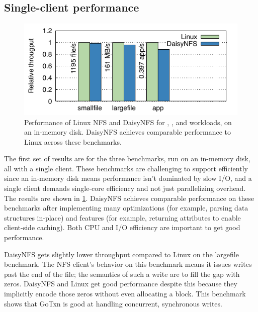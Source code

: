\subsection{Single-client performance}



\begin{figure}[ht]
  \centering
  \includegraphics{daisy-nfs/fig/bench.pdf}
  \caption[Performance for smallfile, largefile, and app benchmarks]%
  {Performance of Linux NFS and DaisyNFS for ,
    , and  workloads, on an in-memory disk.
    DaisyNFS achieves comparable performance to Linux across these benchmarks.}
  \label{fig:eval:bench}
\end{figure}

The first set of results are for the three benchmarks, run on an in-memory disk, all
with a single client. These benchmarks are challenging to support efficiently
since an in-memory disk means performance isn't dominated by slow I/O, and a
single client demands single-core efficiency and not just parallelizing
overhead. The results are shown in \cref{fig:eval:bench}. DaisyNFS achieves
comparable performance on these benchmarks after implementing many optimizations
(for example, parsing data structures in-place) and features (for example,
returning attributes to enable client-side caching). Both CPU and I/O efficiency
are important to get good performance.

DaisyNFS gets slightly lower throughput compared to Linux on the largefile
benchmark. The NFS client's behavior on
this benchmark means it issues writes past the end of the file; the semantics of
such a write are to fill the gap with zeros. DaisyNFS and Linux get good
performance despite this because they implicitly encode those zeros without even
allocating a block. This benchmark shows that GoTxn is good at handling
concurrent, synchronous writes.

